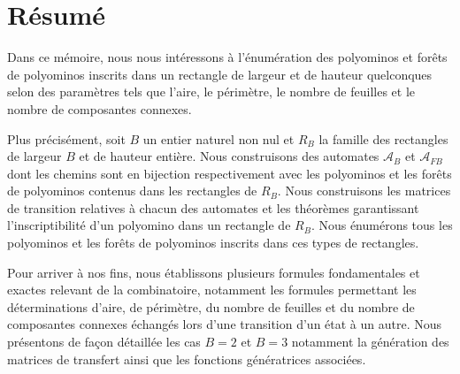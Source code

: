 \chapter*{Résumé}
Dans ce mémoire, nous nous intéressons à l'énumération des polyominos et forêts de polyominos inscrits dans un rectangle de largeur et de hauteur quelconques selon des paramètres tels que l'aire, le périmètre, le nombre de feuilles et le nombre de composantes connexes.

 Plus précisément, soit $B$ un entier naturel non nul et $R_{B}$ la famille des rectangles de largeur $B$ et de hauteur entière. Nous construisons des automates $\mathcal{A}_{B}$ et $\mathcal{A}_{FB}$ dont les chemins sont en bijection respectivement avec les polyominos et les forêts de polyominos contenus dans les rectangles de $R_{B}$. Nous construisons les matrices de transition relatives à chacun des automates et les théorèmes garantissant l'inscriptibilité  d'un polyomino dans un rectangle de $R_{B}$. Nous énumérons tous les polyominos et les forêts de polyominos inscrits dans ces types de rectangles.
 
  Pour arriver à nos fins, nous établissons plusieurs formules fondamentales et exactes relevant de la combinatoire, notamment les formules permettant les déterminations d'aire, de périmètre, du nombre de feuilles et du nombre de composantes connexes échangés lors d'une transition d'un état à un autre. Nous présentons de façon détaillée les cas $B=2$ et $B=3$ notamment la génération des matrices de transfert ainsi que les fonctions génératrices associées.
